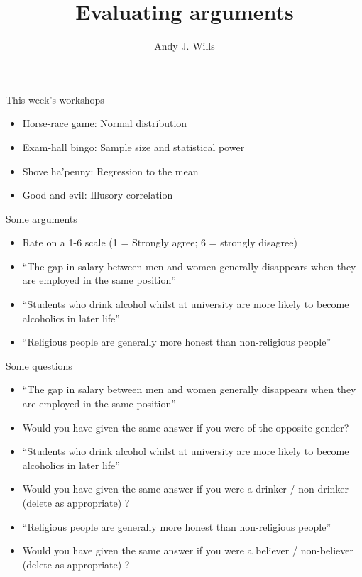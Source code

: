 \documentclass{beamer}
\title[Critical Thinking]{Evaluating arguments}
\author{Andy J. Wills}
\date{}
\begin{document}
\frame{\titlepage}

\begin{frame}{This week's workshops}
  \begin{itemize}
  \item Horse-race game: Normal distribution
  \item Exam-hall bingo: Sample size and statistical power
  \item Shove ha'penny: Regression to the mean
  \item Good and evil: Illusory correlation
  \end{itemize}
\end{frame}

\begin{frame}{Some arguments}
\begin{itemize}
\item Rate on a 1-6 scale (1 = Strongly agree; 6 = strongly disagree)
\item ``The gap in salary between men and women generally disappears when they are employed in the same position''
\item ``Students who drink alcohol whilst at university are more likely to become alcoholics in later life''
\item ``Religious people are generally more honest than non-religious people''
\end{itemize}
\end{frame}

\begin{frame}{Some questions}
\begin{itemize}
\item ``The gap in salary between men and women generally disappears when they are employed in the same position''
\item Would you have given the same answer if you were of the opposite gender?
\item ``Students who drink alcohol whilst at university are more likely to become alcoholics in later life''
\item Would you have given the same answer if you were a drinker / non-drinker (delete as appropriate) ?
\item ``Religious people are generally more honest than non-religious people''
\item Would you have given the same answer if you were a believer / non-believer (delete as appropriate) ?
\end{itemize}
\end{frame}
\end{document}
